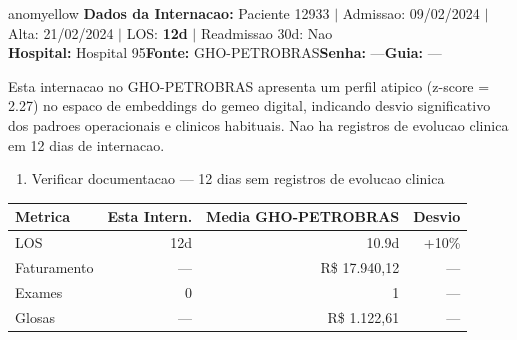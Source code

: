 \documentclass[a4paper,10pt]{article}
\begin{document}
\begin{anomalycard}[Internacao 80516 | GHO-PETROBRAS | MODERADO (z=2.27)]{anomyellow}
\textbf{Dados da Internacao:} Paciente 12933 $\mid$ Admissao: 09/02/2024 $\mid$ Alta: 21/02/2024 $\mid$ LOS: \textbf{12d} $\mid$ Readmissao 30d: Nao\\
\textbf{Hospital:} Hospital 95\quad\textbf{Fonte:} GHO-PETROBRAS\quad\textbf{Senha:} ---\quad\textbf{Guia:} ---\\
\vspace{2pt}\begin{tcolorbox}[colback=severityred!20,colframe=anomyellow,title={\textbf{Interpretacao de Negocio}},fonttitle=\bfseries\small,left=4pt,right=4pt,top=3pt,bottom=3pt]
{\small Esta internacao no GHO-PETROBRAS apresenta um perfil atipico (z-score = 2.27) no espaco de embeddings do gemeo digital, indicando desvio significativo dos padroes operacionais e clinicos habituais. Nao ha registros de evolucao clinica em 12 dias de internacao.}
\end{tcolorbox}
\begin{tcolorbox}[colback=severityyellow!30,colframe=anomorange,title={\textbf{Recomendacoes Especificas}},fonttitle=\bfseries\small,left=4pt,right=4pt,top=3pt,bottom=3pt]
\begin{enumerate}[nosep,leftmargin=16pt]
\item {\small Verificar documentacao --- 12 dias sem registros de evolucao clinica}
\end{enumerate}
\end{tcolorbox}
\begin{center}\begin{tabular}{l r r r}\toprule\textbf{Metrica} & \textbf{Esta Intern.} & \textbf{Media GHO-PETROBRAS} & \textbf{Desvio} \\\midrule
LOS & 12d & 10.9d & +10\% \\
Faturamento & --- & R\$ 17.940,12 & --- \\
Exames & 0 & 1 & --- \\
Glosas & --- & R\$ 1.122,61 & --- \\
\bottomrule\end{tabular}\end{center}


\end{anomalycard}
\end{document}
